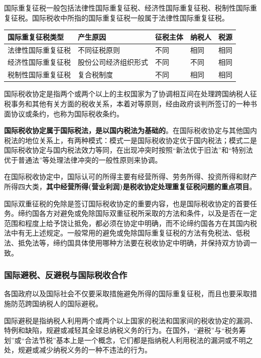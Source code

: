 \documentclass[UTF8,12pt]{ctexart}
\numberwithin{equation}{section} %
\numberwithin{figure}{section}
\numberwithin{table}{section}
\begin{document}
	国际重复征税一般包括法律性国际重复征税、经济性国际重复征税、税制性国际重复征税。国际税收中所指的国际重复征税一般属于法律性国际重复征税。
	\begin{table}
		\centering
		\begin{tabular}{|l|l|l|l|l|} 
			\hline
			国际重复征税类型  & 产生原因 & 征税主体 & 纳税人 & 税源  \\
			\hline
			法律性国际重复征税 & 不同征税原则 & 不同 & 相同  & 相同  \\
			\hline
			经济性国际重复征税 & 股份公司经济组织形式 & 不同 & 不同  & 相同     \\
			\hline
			税制性国际重复征税 & 复合税制度 & 不同 & 相同  & 相同 \\
			\hline    
		\end{tabular}
	\end{table}
	
	国际税收协定是指两个或两个以上的主权国家为了协调相互间在处理跨国纳税人征税事务和其他有关方面的税收关系，本着对等原则，经由政府谈判所签订的一种书面协议或条约，也称为国际税收条约。
	
	\textbf{国际税收协定属于国际税法，是以国内税法为基础的}。在国际税收协定与其他国内税法的地位关系上，有两种模式：模式一是国际税收协定优于国内税法；模式二是国际税收协定与国内税法效力等同，在出现冲突时按照“新法优于旧法”和“特别法优于普通法”等处理法律冲突的一般性原则来协调。
	
	在国际税收协定中，国际认可的所得主要有经营所得、劳务所得、投资所得和财产所得四大类，\textbf{其中经营所得(营业利润)是税收协定处理重复征税问题的重点项目}。
	
	国际双重征税的免除是签订国际税收协定的重要内容，也是国际税收协定的首要任务。缔约国各方对避免或免除国际双重征税所采取的方法和条件，以及是否在一定范围和程度上给予饶让抵免，都必须在协定中明确，而不论缔约国各方在其国内税法中有无上述规定。一般常用的避免或免除国际重复征税的方法有免税法、低税法、抵免法等，缔约国具体使用哪种方法要在税收协定中明确，并保持双方协调一致。
	
	\subsubsection{国际避税、反避税与国际税收合作}
	各国政府以及国际社会不仅要采取措施避免所得的国际重复征税，而且也要采取措施防范跨国纳税人的国际避税。
	
	国际避税是指纳税人利用两个或两个以上国家的税法和国家间的税收协定的漏洞、特例和缺陷，规避或减轻其全球总纳税义务的行为。在国外，“避税”与“税务筹划”或“合法节税”基本上是一个概念，它们都是指纳税人利用税法的漏洞或不明之处，规避或减少纳税义务的一种不违法的行为。
	
\end{document}
